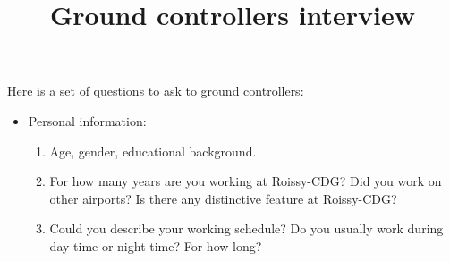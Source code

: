 \documentclass{article}
\begin{document}
		
	\title{Ground controllers interview}
	\maketitle
Here is a set of questions to ask to ground controllers:

\begin{itemize}
    \item Personal information:
        \begin{enumerate}
            \item Age, gender, educational background.
            \item For how many years are you working at Roissy-CDG? Did you work on other airports? Is there any distinctive feature at Roissy-CDG? 
            \item Could you describe your working schedule? Do you usually work during day time or night time? For how long?
            

\end{enumerate}
\end{itemize}
\end{document}
